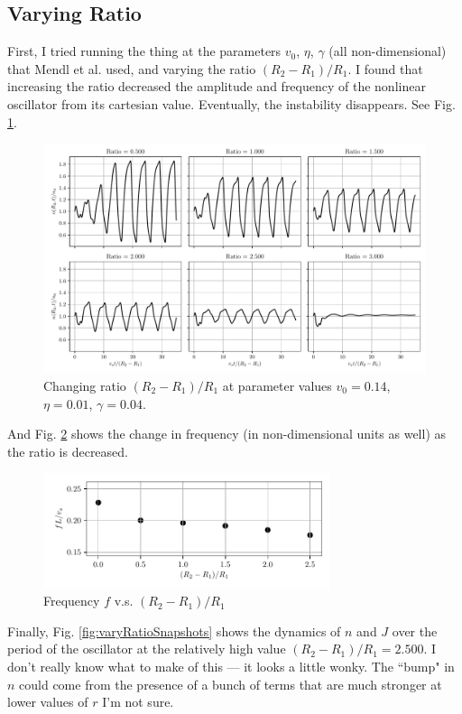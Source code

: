 \documentclass[12pt]{article}
\begin{document}
		\subsection{Varying Ratio}
		First, I tried running the thing at the parameters $v_0$, $\eta$, $\gamma$ (all non-dimensional) that Mendl et al. used, and varying the ratio $(R_2 - R_1) / R_1$. I found that increasing the ratio decreased the amplitude and frequency of the nonlinear oscillator from its cartesian value.  Eventually, the instability disappears.  See Fig. \ref{fig:varyRatio}.
		\begin{figure}[H]
			\centering
			\includegraphics[width=\textwidth]{Figures/varyRatio.pdf}
			\caption{Changing ratio $(R_2 - R_1) / R_1$ at parameter values $v_0 = 0.14$, $\eta = 0.01$, $\gamma = 0.04$.}\label{fig:varyRatio}
		\end{figure}
	And Fig. \ref{fig:frequencyRatio} shows the change in frequency (in non-dimensional units as well) as the ratio is decreased.
	\begin{figure}[H]
		\centering
		\includegraphics[width = 0.75\textwidth]{Figures/frequencyRatio.pdf}
		\caption{Frequency $f$ v.s. $(R_2 - R_1) / R_1$}\label{fig:frequencyRatio}
	\end{figure}
	Finally, Fig. \ref{fig:varyRatioSnapshots} shows the dynamics of $n$ and $J$ over the period of the oscillator at the relatively high value $(R_2 - R_1) / R_1 = 2.500$.  I don't really know what to make of this --- it looks a little wonky.  The ``bump" in $n$ could come from the presence of a bunch of terms that are much stronger at lower values of $r$ I'm not sure.
	
\end{document}
